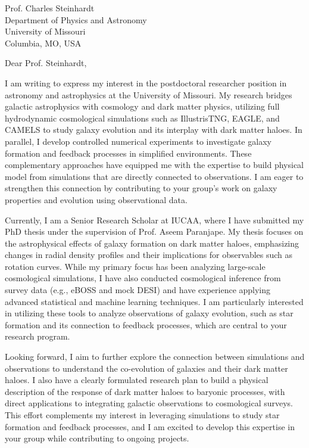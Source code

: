 \documentclass[11pt]{letter}
\begin{document}
\begin{letter}{Prof. Charles Steinhardt \\ Department of Physics and Astronomy \\ University of Missouri \\ Columbia, MO, USA}
    
\opening{Dear Prof. Steinhardt,}

I am writing to express my interest in the postdoctoral researcher position in astronomy and astrophysics at the University of Missouri. My research bridges galactic astrophysics with cosmology and dark matter physics, utilizing full hydrodynamic cosmological simulations such as IllustrisTNG, EAGLE, and CAMELS to study galaxy evolution and its interplay with dark matter haloes. In parallel, I develop controlled numerical experiments to investigate galaxy formation and feedback processes in simplified environments. These complementary approaches have equipped me with the expertise to build physical model from simulations that are directly connected to observations. I am eager to strengthen this connection by contributing to your group's work on galaxy properties and evolution using observational data. 

Currently, I am a Senior Research Scholar at IUCAA, where I have submitted my PhD thesis under the supervision of Prof. Aseem Paranjape. My thesis focuses on the astrophysical effects of galaxy formation on dark matter haloes, emphasizing changes in radial density profiles and their implications for observables such as rotation curves. While my primary focus has been analyzing large-scale cosmological simulations, I have also conducted cosmological inference from survey data (e.g., eBOSS and mock DESI) and have experience applying advanced statistical and machine learning techniques. I am particularly interested in utilizing these tools to analyze observations of galaxy evolution, such as star formation and its connection to feedback processes, which are central to your research program.

Looking forward, I aim to further explore the connection between simulations and observations to understand the co-evolution of galaxies and their dark matter haloes. I also have a clearly formulated research plan to build a physical description of the response of dark matter haloes to baryonic processes, with direct applications to integrating galactic observations to cosmological surveys. This effort complements my interest in leveraging simulations to study star formation and feedback processes, and I am excited to develop this expertise in your group while contributing to ongoing projects.


\end{letter}
\end{document}
